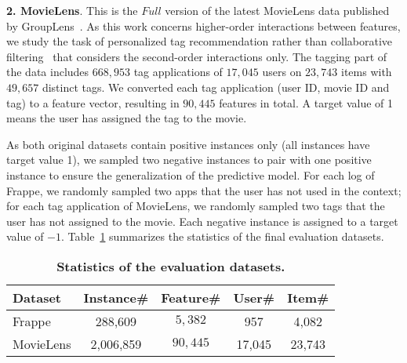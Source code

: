 \textbf{2. MovieLens}. This is the $Full$ version of the latest MovieLens data published by GroupLens~\cite{MovielensData}. As this work concerns higher-order interactions between features, we study the task of personalized tag recommendation rather than collaborative filtering~\cite{He:WWW2017} that considers the second-order interactions only. The tagging part of the data includes $668,953$ tag applications of $17,045$ users on $23,743$ items with $49,657$ distinct tags. We converted each tag application (\ie user ID, movie ID and tag) to a feature vector, resulting in $90,445$ features in total. A target value of 1 means the user has assigned the tag to the movie. \\\vspace{-5pt}

As both original datasets contain positive instances only (\ie all instances have target value 1), we sampled two negative instances to pair with one positive instance to ensure the generalization of the predictive model. 
For each log of Frappe, we randomly sampled two apps that the user has not used in the context; for each tag application of MovieLens, we randomly sampled two tags that the user has not assigned to the movie. 
Each negative instance is assigned to a target value of $-1$. Table~\ref{tab:dataset} summarizes the statistics of the final evaluation datasets. 

\begin{table}[t]
	\begin{center}
		\caption{\textbf{Statistics of the evaluation datasets.}}
		\vspace{-10pt}
		\label{tab:dataset}
		\begin{tabular}{ | l | c | c | c | c | }
			\hline
			\textbf{Dataset} & \textbf{Instance\#} & \textbf{Feature\#} & \textbf{User\#} & \textbf{Item\#} \\ \hline
			Frappe	& 288,609 & $5,382$ & 957 & 4,082\\ \hline
			MovieLens	& 2,006,859	& $90,445$ & 17,045 & 23,743 \\ \hline
		\end{tabular}
		\vspace{-15pt}
	\end{center}
\end{table}

